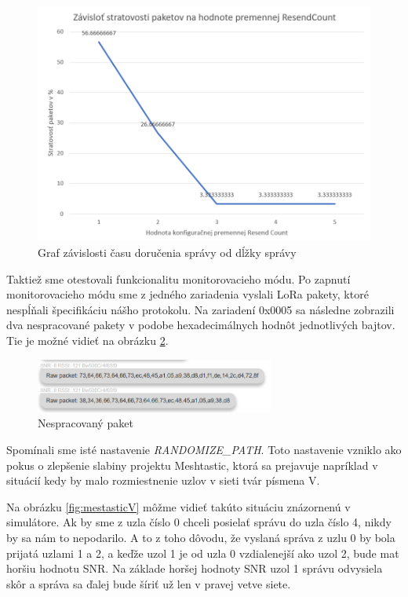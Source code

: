 \documentclass[slovak,master]{diploma}
\begin{document}
\begin{figure}[h!]
  \centering
  \includegraphics[width=1\textwidth]{Figures/packetLossResendCount.png}
  \caption{Graf závislosti času doručenia správy od dĺžky správy}
  \label{fig:plResend}
\end{figure}

\newpage
Taktiež sme otestovali funkcionalitu monitorovacieho módu. Po zapnutí monitorovacieho módu sme z jedného zariadenia vyslali LoRa pakety, 
ktoré nespĺňali špecifikáciu nášho protokolu. Na zariadení 0x0005 sa následne zobrazili dva nespracované pakety v podobe hexadecimálnych hodnôt 
jednotlivých bajtov. Tie je možné vidieť na obrázku \ref{fig:rawPacket}.
\begin{figure}[h!]
  \centering
  \includegraphics[width=0.7\textwidth]{Figures/rawPacket.png}
  \caption{Nespracovaný paket}
  \label{fig:rawPacket}
\end{figure}


Spomínali sme isté nastavenie \emph{RANDOMIZE\_PATH}. Toto nastavenie vzniklo ako pokus o zlepšenie slabiny 
projektu Meshtastic, ktorá sa prejavuje napríklad v situácií kedy by malo rozmiestnenie uzlov v sieti tvár písmena V.

Na obrázku \ref{fig:mestasticV} môžme vidieť takúto situáciu znázornenú v simulátore. Ak by sme z uzla číslo 0 chceli posielať správu do uzla číslo 4, nikdy by sa nám to nepodarilo.
A to z toho dôvodu, že vyslaná správa z uzlu 0 by bola prijatá uzlami 1 a 2, a keďže uzol 1 je od uzla 0 vzdialenejší ako uzol 2, bude mat horšiu hodnotu SNR.
Na základe horšej hodnoty SNR uzol 1 správu odvysiela skôr a správa sa ďalej bude šíriť už len v pravej vetve siete.
\end{document}
